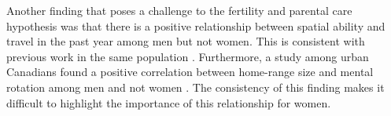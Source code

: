Another finding that poses a challenge to the fertility and parental care hypothesis was that there is a positive relationship between spatial ability and travel in the past year among men but not women.  This is consistent with previous work in the same population \citep{vashro2014spatial}.  Furthermore, a study among urban Canadians found a positive correlation between home-range size and mental rotation among men and not women \citep{ecuyer2004spatial}.  The consistency of this finding makes it difficult to highlight the importance of this relationship for women.









